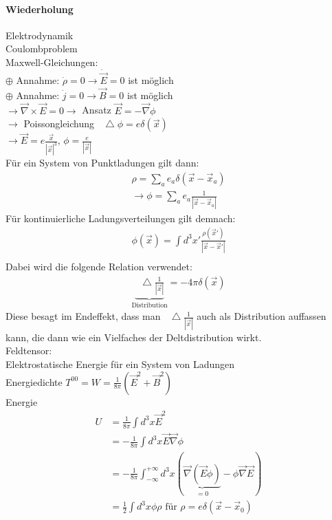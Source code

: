 \documentclass[a4paper]{article}
\newcommand*\laplace{\mathop{}\!\mathbin\bigtriangleup}
\begin{document}
\paragraph{Wiederholung}
Elektrodynamik\\
Coulombproblem\\
Maxwell-Gleichungen:\\
$\oplus$ Annahme: $\dot{\rho}=0\rightarrow \dot{\vec{E}}=0$ ist möglich\\
$\oplus$ Annahme: $\dot{j}=0\rightarrow \vec{B}=0$ ist möglich\\
$\rightarrow \vec{\nabla}\times\vec{E}=0 \rightarrow$ Ansatz
$\vec{E}=-\vec{\nabla}\phi$\\
$\rightarrow$ Poissongleichung $\laplace\phi=e\delta(\vec{x})$\\
$\rightarrow \vec{E}=e\frac{\vec{x}}{|\vec{x}|^3}$, $\phi=\frac{e}{|\vec{x}|}$\\
Für ein System von Punktladungen gilt dann:
\begin{align}
\rho=\sum_a e_a \delta(\vec{x}-\vec{x}_a)\\
\rightarrow \phi=\sum_a e_a \frac{1}{|\vec{x}-\vec{x}_a|}
\end{align}
Für kontinuierliche Ladungsverteilungen gilt demnach:
\begin{align}
\phi(\vec{x})=\int d^3x'\frac{\rho(\vec{x}')}{|\vec{x}-\vec{x}'|}\\
\end{align}
Dabei wird die folgende Relation verwendet:
\begin{align}
\underbrace{\laplace
\frac{1}{|\vec{x}|}}_{\text{Distribution}}=-4\pi\delta(\vec{x})
\end{align}
Diese besagt im Endeffekt, dass man $\laplace \frac{1}{|\vec{x}|}$ auch als
Distribution auffassen kann, die dann wie ein Vielfaches der Deltdistribution
wirkt.\\
Feldtensor:\\
Elektrostatische Energie für ein System von Ladungen\\
Energiedichte $T^{00}=W=\frac{1}{8\pi}\left(\vec{E}^2+\vec{B}^2\right)$\\
Energie 
\begin{align}
U&=\frac{1}{8\pi}\int d^3x \vec{E}^2\\
&=-\frac{1}{8\pi}\int d^3x \vec{E}\vec{\nabla}\phi\\
&=-\frac{1}{8\pi}\int^{+\infty}_{-\infty} d^3x \left(
\underbrace{\vec{\nabla}\left(\vec{E}\phi\right)}_{=0}-\phi\vec{\nabla}\vec{E}\right)\\
&=\frac{1}{2}\int d^3x\phi\rho \text{ für } \rho=e\delta(\vec{x}-\vec{x}_0)
\end{align}
\end{document}
